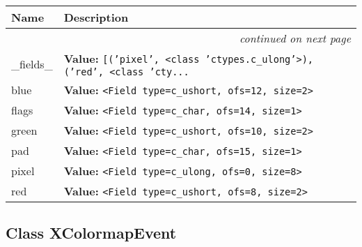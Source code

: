     \vspace{-1cm}
\hspace{\varindent}\begin{longtable}{|p{\varnamewidth}|p{\vardescrwidth}|l}
\cline{1-2}
\cline{1-2} \centering \textbf{Name} & \centering \textbf{Description}& \\
\cline{1-2}
\endhead\cline{1-2}\multicolumn{3}{r}{\small\textit{continued on next page}}\\\endfoot\cline{1-2}
\endlastfoot\raggedright \_\-f\-i\-e\-l\-d\-s\-\_\- & \raggedright \textbf{Value:} 
{\tt \texttt{[}\texttt{(}\texttt{'}\texttt{pixel}\texttt{'}\texttt{, }{\textless}class 'ctypes.c\_ulong'{\textgreater}\texttt{)}\texttt{, }\texttt{(}\texttt{'}\texttt{red}\texttt{'}\texttt{, }{\textless}class 'cty\texttt{...}}&\\
\cline{1-2}
\raggedright b\-l\-u\-e\- & \raggedright \textbf{Value:} 
{\tt {\textless}Field type=c\_ushort, ofs=12, size=2{\textgreater}}&\\
\cline{1-2}
\raggedright f\-l\-a\-g\-s\- & \raggedright \textbf{Value:} 
{\tt {\textless}Field type=c\_char, ofs=14, size=1{\textgreater}}&\\
\cline{1-2}
\raggedright g\-r\-e\-e\-n\- & \raggedright \textbf{Value:} 
{\tt {\textless}Field type=c\_ushort, ofs=10, size=2{\textgreater}}&\\
\cline{1-2}
\raggedright p\-a\-d\- & \raggedright \textbf{Value:} 
{\tt {\textless}Field type=c\_char, ofs=15, size=1{\textgreater}}&\\
\cline{1-2}
\raggedright p\-i\-x\-e\-l\- & \raggedright \textbf{Value:} 
{\tt {\textless}Field type=c\_ulong, ofs=0, size=8{\textgreater}}&\\
\cline{1-2}
\raggedright r\-e\-d\- & \raggedright \textbf{Value:} 
{\tt {\textless}Field type=c\_ushort, ofs=8, size=2{\textgreater}}&\\
\cline{1-2}
\end{longtable}



\subsection{Class XColormapEvent}

